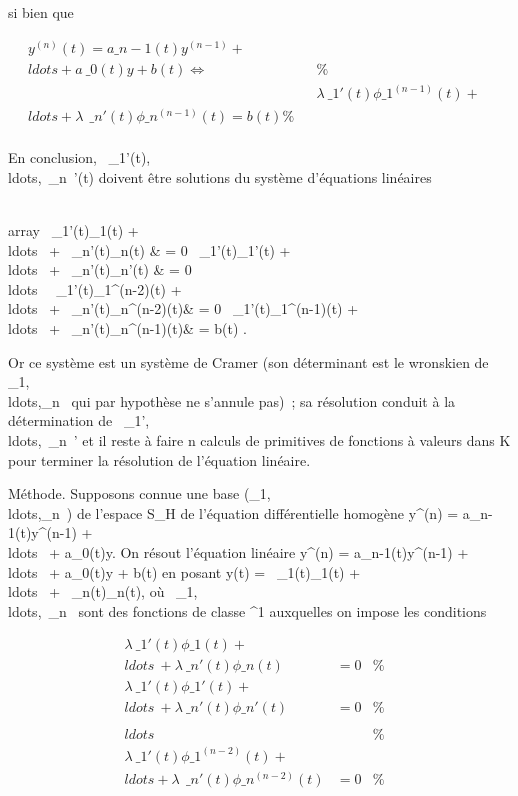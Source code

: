 \documentclass[]{article}
\begin{document}
si bien que

\begin{align*} y^(n)(t) = a\_
n-1(t)y^(n-1) +
\\ldots + a~\_
0(t)y + b(t) \Leftrightarrow&& \%&
\\ & &
\lambda~\_1'(t)\phi\_1^(n-1)(t) +
\\ldots + \lambda~~\_
n'(t)\phi\_n^(n-1)(t) = b(t)\%&
\\ \end{align*}

En conclusion,
\lambda~\_1'(t),\\ldots,\lambda~\_n~'(t)
doivent être solutions du système d'équations linéaires

\left \\array
\lambda~\_1'(t)\phi\_1(t) +
\\ldots~ +
\lambda~\_n'(t)\phi\_n(t) & = 0 \cr
\lambda~\_1'(t)\phi\_1'(t) +
\\ldots~ +
\lambda~\_n'(t)\phi\_n'(t) & = 0\cr
\\ldots~
\cr \lambda~\_1'(t)\phi\_1^(n-2)(t) +
\\ldots~ +
\lambda~\_n'(t)\phi\_n^(n-2)(t)& = 0 \cr
\lambda~\_1'(t)\phi\_1^(n-1)(t) +
\\ldots~ +
\lambda~\_n'(t)\phi\_n^(n-1)(t)& = b(t) 
\right .

Or ce système est un système de Cramer (son déterminant est le wronskien
de
\phi\_1,\\ldots,\phi\_n~
qui par hypothèse ne s'annule pas)~; sa résolution conduit à la
détermination de
\lambda~\_1',\\ldots,\lambda~\_n~'
et il reste à faire n calculs de primitives de fonctions à valeurs dans
K pour terminer la résolution de l'équation linéaire.

Méthode. Supposons connue une base
(\phi\_1,\\ldots,\phi\_n~)
de l'espace S\_H de l'équation différentielle homogène
y^(n) = a\_n-1(t)y^(n-1) +
\\ldots~ +
a\_0(t)y. On résout l'équation linéaire y^(n) =
a\_n-1(t)y^(n-1) +
\\ldots~ +
a\_0(t)y + b(t) en posant y(t) = \lambda~\_1(t)\phi\_1(t)
+ \\ldots~ +
\lambda~\_n(t)\phi\_n(t), où
\lambda~\_1,\\ldots,\lambda~\_n~
sont des fonctions de classe ^1 auxquelles on impose les
conditions

\begin{align*} \lambda~\_1'(t)\phi\_1(t) +
\\ldots~ +
\lambda~\_n'(t)\phi\_n(t)& = 0& \%&
\\ \lambda~\_1'(t)\phi\_1'(t) +
\\ldots~ +
\lambda~\_n'(t)\phi\_n'(t)& = 0& \%&
\\
\\ldots~& & \%&
\\
\lambda~\_1'(t)\phi\_1^(n-2)(t) +
\\ldots + \lambda~~\_
n'(t)\phi\_n^(n-2)(t)& = 0& \%&
\\ \end{align*}
\end{document}
